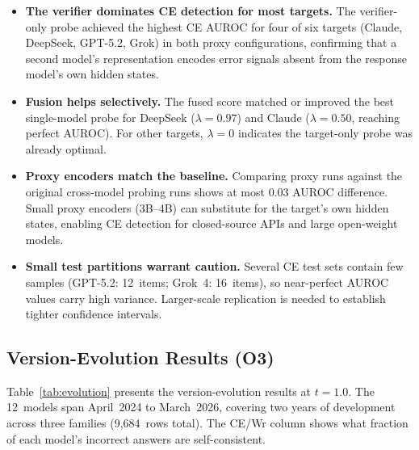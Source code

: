 \documentclass[12pt,twocolumn]{article}
\begin{document}
\begin{itemize}[nosep]
\item \textbf{The verifier dominates CE detection for most targets.}
      The verifier-only probe achieved the highest CE AUROC for four
      of six targets (Claude, DeepSeek, GPT-5.2, Grok) in both proxy
      configurations, confirming that a second model's representation
      encodes error signals absent from the response model's own
      hidden states.
\item \textbf{Fusion helps selectively.} The fused score matched or
      improved the best single-model probe for DeepSeek
      ($\lambda = 0.97$) and Claude ($\lambda = 0.50$, reaching
      perfect AUROC). For other targets, $\lambda = 0$ indicates the
      target-only probe was already optimal.
\item \textbf{Proxy encoders match the baseline.} Comparing proxy
      runs against the original cross-model probing runs shows at most 0.03
      AUROC difference. Small proxy encoders (3B--4B) can substitute
      for the target's own hidden states, enabling CE detection for
      closed-source APIs and large open-weight models.
\item \textbf{Small test partitions warrant caution.} Several CE
      test sets contain few samples (GPT-5.2: 12~items; Grok~4:
      16~items), so near-perfect AUROC values carry high variance.
      Larger-scale replication is needed to establish tighter
      confidence intervals.
\end{itemize}

\subsection{Version-Evolution Results (O3)}
\label{sec:results-evo}

Table~\ref{tab:evolution} presents the version-evolution results at
$t{=}1.0$. The 12~models span April~2024 to March~2026, covering
two years of development across three families (9,684~rows total).
The CE/Wr column shows what fraction of each model's incorrect
answers are self-consistent.
\end{document}
